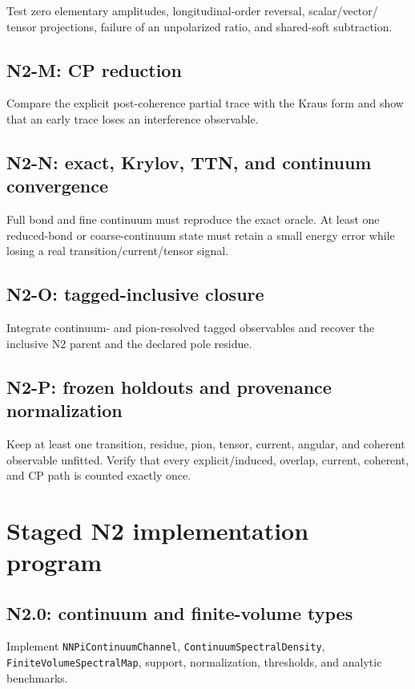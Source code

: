 \documentclass[11pt]{article}
\newcommand{\ContinuumChannel}{\texttt{NNPi\allowbreak Continuum\allowbreak Channel}}
\newcommand{\SpectralDensity}{\texttt{Continuum\allowbreak Spectral\allowbreak Density}}
\newcommand{\FiniteVolumeMap}{\texttt{FiniteVolume\allowbreak Spectral\allowbreak Map}}
\begin{document}
Test zero elementary amplitudes, longitudinal-order reversal, scalar/vector/
tensor projections, failure of an unpolarized ratio, and shared-soft
subtraction.

\subsection{N2-M: CP reduction}

Compare the explicit post-coherence partial trace with the Kraus form and show
that an early trace loses an interference observable.

\subsection{N2-N: exact, Krylov, TTN, and continuum convergence}

Full bond and fine continuum must reproduce the exact oracle.  At least one
reduced-bond or coarse-continuum state must retain a small energy error while
losing a real transition/current/tensor signal.

\subsection{N2-O: tagged-inclusive closure}

Integrate continuum- and pion-resolved tagged observables and recover the
inclusive N2 parent and the declared pole residue.

\subsection{N2-P: frozen holdouts and provenance normalization}

Keep at least one transition, residue, pion, tensor, current, angular, and
coherent observable unfitted.  Verify that every explicit/induced, overlap,
current, coherent, and CP path is counted exactly once.

\section{Staged N2 implementation program}
\label{sec:stages}

\subsection{N2.0: continuum and finite-volume types}

Implement \ContinuumChannel, \SpectralDensity, \FiniteVolumeMap, support,
normalization, thresholds, and analytic benchmarks.
\end{document}
